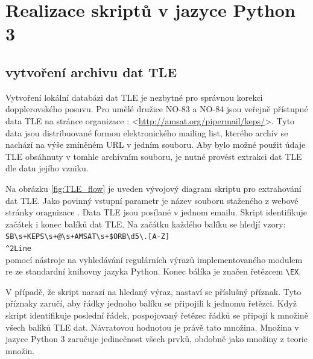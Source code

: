 \chapter{Realizace skriptů v jazyce Python 3}

\section{vytvoření archivu dat TLE}
  Vytvoření lokální databázi dat TLE je nezbytné pro správnou korekci dopplerovského posuvu. Pro umělé družice NO-83 a NO-84 jsou veřejně přístupné data TLE na stránce organizace : <\url{http://amsat.org/pipermail/keps/}>. Tyto data jsou distribuované formou elektronického mailing list, kterého archív se nachází na výše zmíněném URL v jedním souboru. Aby bylo možné použit údaje TLE obsáhnuty v tomhle archivním souboru, je nutné provést extrakci dat TLE dle datu jejího vzniku.

  Na obrázku \ref{fig:TLE_flow} je uveden vývojový diagram skriptu pro extrahování dat TLE. Jako povinný vstupní parametr je název souboru staženého z webové stránky oragnizace . Data TLE jsou posílané v jednom emailu. Skript identifikuje začátek i konec balíků dat TLE. Na začátku každého balíku se hledjí vzory:\\
  \texttt{SB\textbackslash s+KEPS\textbackslash s+@\textbackslash s+AMSAT\textbackslash s+\$ORB\textbackslash d{5}\textbackslash.[A-Z]}\\
  \texttt{\textasciicircum 2Line}\\
  pomocí nástroje na vyhledávání regulárních výrazů implementovaného modulem re ze standardní knihovny jazyka Python. Konec bálíka je značen řetězcem
  \texttt{\textbackslash EX}.

  V případě, že skript narazí na hledaný výraz, nastaví se příslušný příznak. Tyto příznaky zaručí, aby řádky jednoho balíku se připojili k jednomu řetězci. Když skript identifikuje poslední řádek, pospojovaný řetězec řádků se připojí k množině všech balíků TLE dat. Návratovou hodnotou je právě tato množina. Množina v jazyce Python 3 zaručuje jedinečnost všech prvků, obdobně jako množiny z teorie množin.

